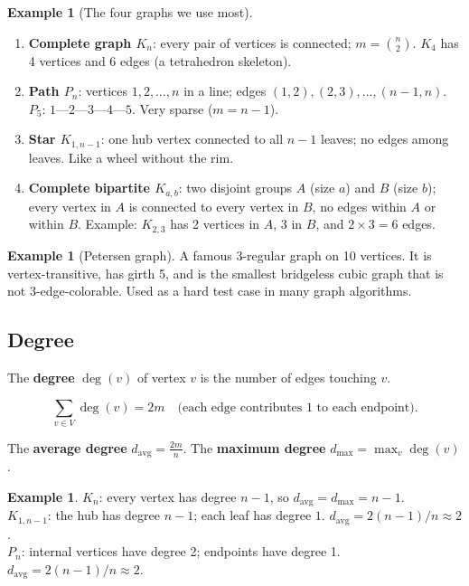 \documentclass[12pt]{article}
\theoremstyle{definition}
\newtheorem{example}[theorem]{Example}
\theoremstyle{remark}
\begin{document}
\begin{example}[The four graphs we use most]
\leavevmode
\begin{enumerate}
  \item \textbf{Complete graph $K_n$}:
        every pair of vertices is connected; $m = \binom{n}{2}$.
        $K_4$ has 4 vertices and 6 edges (a tetrahedron skeleton).

  \item \textbf{Path $P_n$}:
        vertices $1,2,\ldots,n$ in a line; edges $(1,2),(2,3),\ldots,(n{-}1,n)$.
        $P_5$: \quad $1$---$2$---$3$---$4$---$5$.  Very sparse ($m = n-1$).

  \item \textbf{Star $K_{1,n-1}$}:
        one hub vertex connected to all $n-1$ leaves; no edges among leaves.
        Like a wheel without the rim.

  \item \textbf{Complete bipartite $K_{a,b}$}:
        two disjoint groups $A$ (size $a$) and $B$ (size $b$);
        every vertex in $A$ is connected to every vertex in $B$,
        no edges within $A$ or within $B$.  Example: $K_{2,3}$ has 2 vertices
        in $A$, 3 in $B$, and $2\times 3 = 6$ edges.
\end{enumerate}
\end{example}

\begin{example}[Petersen graph]
A famous 3-regular graph on 10 vertices.  It is vertex-transitive, has girth 5,
and is the smallest bridgeless cubic graph that is not 3-edge-colorable.
Used as a hard test case in many graph algorithms.
\end{example}

\subsection{Degree}

The \textbf{degree} $\deg(v)$ of vertex $v$ is the number of edges touching $v$.

\[
  \sum_{v \in V} \deg(v) = 2m
  \quad\text{(each edge contributes 1 to each endpoint)}.
\]

The \textbf{average degree} $d_{\mathrm{avg}} = \frac{2m}{n}$.
The \textbf{maximum degree} $d_{\max} = \max_v \deg(v)$.

\begin{example}
$K_n$: every vertex has degree $n-1$, so $d_{\mathrm{avg}} = d_{\max} = n-1$.\\
$K_{1,n-1}$: the hub has degree $n-1$; each leaf has degree $1$.
$d_{\mathrm{avg}} = 2(n-1)/n \approx 2$.\\
$P_n$: internal vertices have degree 2; endpoints have degree 1.
$d_{\mathrm{avg}} = 2(n-1)/n \approx 2$.
\end{example}
\end{document}
